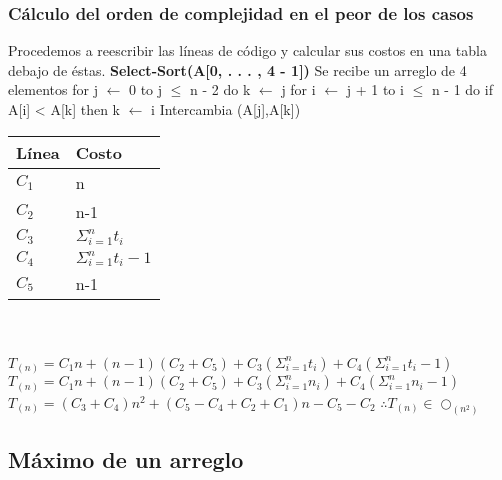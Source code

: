 \documentclass[12pt,twoside]{article}
\begin{document}
\subsubsection{Cálculo del orden de complejidad en el peor de los
casos}
Procedemos a reescribir las líneas de código y calcular sus costos
en una tabla debajo de éstas.\newline \newline
\textbf{Select-Sort(A[0, . . . , 4 - 1])} \hspace*{1cm}Se recibe un arreglo de 4 elementos \newline
for j $\longleftarrow$ 0 to j $\leq$ n - 2 do\newline
\hspace*{1cm}k $\longleftarrow$ j\newline
\hspace*{1cm}for i $\longleftarrow$ j + 1 to i $\leq$ n - 1 do
\newline
\hspace*{1.5cm}if A[i] < A[k] then\newline
\hspace*{2cm}k $\longleftarrow$ i\newline
\hspace*{1.5cm}Intercambia (A[j],A[k])\newline \newline
\begin{tabular}{|l|l|}
\hline
Línea & Costo\\
\hline
$C_{1}$ &n\\
\hline
$C_{2}$ &n-1\\
\hline
$C_{3}$ & $\Sigma_{i=1}^{n}t_{i}$ \\
\hline
$C_{4}$ & $\Sigma_{i=1}^{n}t_{i}-1$ \\
\hline
$C_{5}$ & n-1 \\
\hline
\end{tabular}
\\ \\
$T_{(n)} = C_{1}n+(n-1)(C_{2}+C_{5})+C_{3}(\Sigma_{i=1}
^{n}t_{i})+C_{4}(\Sigma_{i=1}^{n}t_{i}-1)$ \newline
$T_{(n)} = C_{1}n+(n-1)(C_{2}+C_{5})+C_{3}(\Sigma_{i=1}^{n}n_{i})
+C_{4}(\Sigma_{i=1}^{n}n_{i}-1)$ \newline
$T_{(n)} = (C_{3}+C_{4})n^{2}+(C_{5}-C_{4}+C_{2}+C_{1})n-C_{5}-C_{2}
$ \newline
$\therefore T_{(n)}\in\bigcirc_{(n^{2})}$
\subsection{Máximo de un arreglo}
\end{document}
